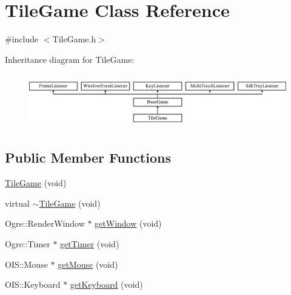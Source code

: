 \hypertarget{classTileGame}{\section{Tile\-Game Class Reference}
\label{classTileGame}
}


{\ttfamily \#include $<$Tile\-Game.\-h$>$}

Inheritance diagram for Tile\-Game\-:\begin{figure}[H]
\begin{center}
\leavevmode
\includegraphics[height=2.382979cm]{classTileGame}
\end{center}
\end{figure}
\subsection*{Public Member Functions}
\begin{DoxyCompactItemize}
\item 
\hyperlink{classTileGame_a3cb3a0ec187c4073e71d2981d5d60fc7}{Tile\-Game} (void)
\item 
virtual \hyperlink{classTileGame_ab9d734fa6d252ab1f13d504891b052e7}{$\sim$\-Tile\-Game} (void)
\item 
Ogre\-::\-Render\-Window $\ast$ \hyperlink{classTileGame_ae9bcb53221ecd38417b5091f23a494f6}{get\-Window} (void)
\item 
Ogre\-::\-Timer $\ast$ \hyperlink{classTileGame_a48717c06ae5991a00c14f765cf2b59ba}{get\-Timer} (void)
\item 
O\-I\-S\-::\-Mouse $\ast$ \hyperlink{classTileGame_ad11ef8decc578d0726beb8fa9525de14}{get\-Mouse} (void)
\item 
O\-I\-S\-::\-Keyboard $\ast$ \hyperlink{classTileGame_a5a9510d3a4d1152c38bece960116c661}{get\-Keyboard} (void)
\end{DoxyCompactItemize}

